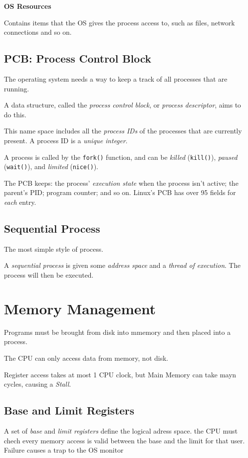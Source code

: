 \documentclass{article}
\begin{document}
\textbf{OS Resources}

Contains items that the OS gives the process access to, such as files, network connections and so on.

\subsection{PCB: Process Control Block}

The operating system needs a way to keep a track of all processes that are running.

A data structure, called the \textit{process control block}, or \textit{process descriptor}, aims to do this.

This name space includes all the \textit{process IDs} of the processes that are currently present. A process ID is a \textit{unique integer}.

A process is called by the \texttt{fork()} function, and can be \textit{killed} (\texttt{kill()}), \textit{paused} (\texttt{wait()}), and \textit{limited} (\texttt{nice()}).

The PCB keeps: the process' \textit{execution state} when the process isn't active; the parent's PID; program counter; and so on. Linux's PCB has over 95 fields for \textit{each} entry.

\subsection{Sequential Process}

The most simple style of process.

A \textit{sequential process} is given some \textit{address space} and a \textit{thread of execution}. The process will then be executed.

\section{Memory Management}
Programs must be brought from disk into mmemory and then placed into a process.

The CPU can only access data from memory, not disk.

Register access takes at most 1 CPU clock, but Main Memory can take mayn cycles, causing a \emph{Stall}.

\subsection{Base and Limit Registers}
A set of \emph{base} and \emph{limit registers} define the logical adress space. the CPU must chech every
memory access is valid between the base and the limit for that user. Failure causes a trap to the OS monitor
\end{document}
